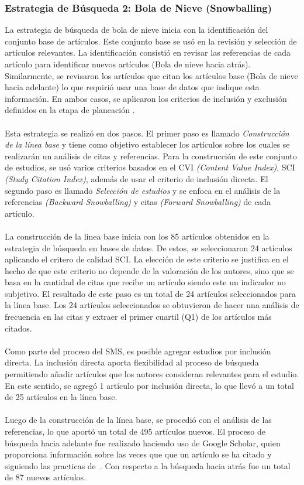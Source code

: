 \subsubsection{Estrategia de Búsqueda 2: Bola de Nieve (Snowballing)}
La estrategia de búsqueda de bola de nieve inicia con la identificación del conjunto base de artículos. Este conjunto base se usó en la revisión y selección de artículos relevantes. La identificación consistió en revisar las referencias de cada artículo para identificar nuevos artículos (Bola de nieve hacia atrás). Similarmente, se revisaron los artículos que citan los artículos base (Bola de nieve hacia adelante) lo que requirió usar una base de datos que indique esta información. En ambos casos, se aplicaron los criterios de inclusión y exclusión definidos en la etapa de planeación \cite{10.1145/2601248.2601268}. \\ \\
Esta estrategia se realizó en dos pasos. El primer paso es llamado \textit{Construcción de la línea base} y tiene como objetivo establecer los artículos sobre los cuales se realizarán un análisis de citas y referencias. Para la construcción de este conjunto de estudios, se usó varios criterios basados en el CVI \textit{(Content Value Index)}, SCI \textit{(Study Citation Index)}, además de usar el criterio de inclusión directa. El segundo paso es llamado \textit{Selección de estudios} y se enfoca en el análisis de la referencias \textit{(Backward Snowballing)} y citas \textit{(Forward Snowballing)} de cada artículo. \\ \\
La construcción de la línea base inicia con los 85 artículos obtenidos en la estrategia de búsqueda en bases de datos. De estos, se seleccionaron 24 artículos aplicando el critero de calidad SCI. La elección de este criterio se justifica en el hecho de que este criterio no depende de la valoración de los autores, sino que se basa en la cantidad de citas que recibe un artículo siendo este un indicador no subjetivo. El resultado de este paso es un total de 24 artículos seleccionados para la línea base. Los 24 artículos seleccionados se obtuvieron de hacer una análisis de frecuencia en las citas y extraer el primer cuartil (Q1) de los artículos más citados.\\ \\
Como parte del proceso del SMS, es posible agregar estudios por inclusión directa. La inclusión directa aporta flexibilidad al proceso de búsqueda permitiendo añadir artículos que los autores consideran relevantes para el estudio. En este sentido, se agregó 1 artículo por inclusión directa, lo que llevó a un total de 25 artículos en la línea base.\\ \\
Luego de la construcción de la línea base, se procedió con el análisis de las referencias, lo que aportó un total de 495 artículos nuevos. El proceso de búsqueda hacia adelante fue realizado haciendo uso de Google Scholar, quien proporciona información sobre las veces que que un artículo se ha citado y siguiendo las practicas de~\cite{8747000}. 
Con respecto a la búsqueda hacia atrás fue un total de 87 nuevos artículos.\\

